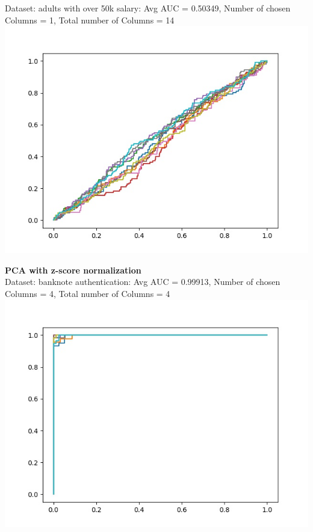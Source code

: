 \documentclass[twoside]{article}
\begin{document}
Dataset: adults with over 50k salary: Avg AUC = 0.50349, Number of chosen Columns =  1, Total number of Columns =  14\\
\includegraphics[scale=0.4]{Plots/Adult_PCA_Zero_Mean.jpg}


\textbf{PCA with z-score normalization}\\
Dataset: banknote authentication: Avg AUC = 0.99913, Number of chosen Columns =  4, Total number of Columns =  4\\
\includegraphics[scale=0.4]{Plots/Banknote_PCA_Z_Score.jpg}
\end{document}
